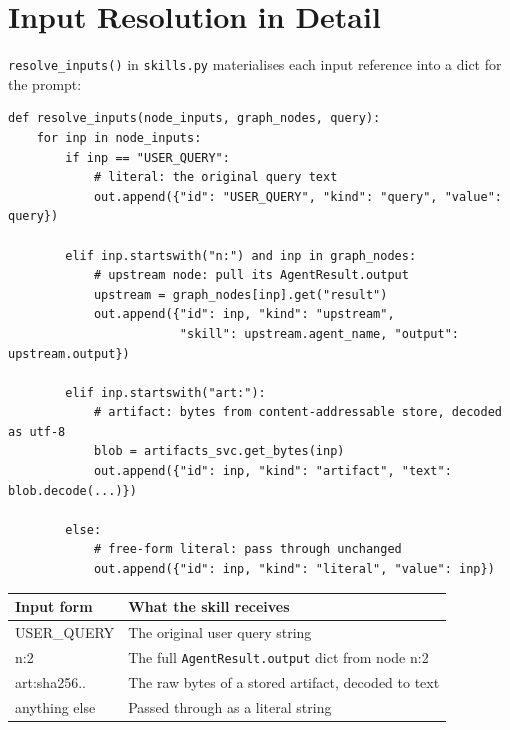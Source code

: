 \documentclass[12pt,a4paper]{article}
\begin{document}
\section{Input Resolution in Detail}

\texttt{resolve\_inputs()} in \texttt{skills.py} materialises each input
reference into a dict for the prompt:

\begin{lstlisting}[style=pycode, caption={Input resolution — skills.py:77--110}]
def resolve_inputs(node_inputs, graph_nodes, query):
    for inp in node_inputs:
        if inp == "USER_QUERY":
            # literal: the original query text
            out.append({"id": "USER_QUERY", "kind": "query", "value": query})

        elif inp.startswith("n:") and inp in graph_nodes:
            # upstream node: pull its AgentResult.output
            upstream = graph_nodes[inp].get("result")
            out.append({"id": inp, "kind": "upstream",
                        "skill": upstream.agent_name, "output": upstream.output})

        elif inp.startswith("art:"):
            # artifact: bytes from content-addressable store, decoded as utf-8
            blob = artifacts_svc.get_bytes(inp)
            out.append({"id": inp, "kind": "artifact", "text": blob.decode(...)})

        else:
            # free-form literal: pass through unchanged
            out.append({"id": inp, "kind": "literal", "value": inp})
\end{lstlisting}

\begin{center}
\begin{tabular}{>{\ttfamily}p{3cm} p{9.5cm}}
\toprule
\normalfont\textbf{Input form} & \normalfont\textbf{What the skill receives} \\
\midrule
USER\_QUERY  & The original user query string \\
n:2          & The full \texttt{AgentResult.output} dict from node n:2 \\
art:sha256.. & The raw bytes of a stored artifact, decoded to text \\
anything else & Passed through as a literal string \\
\bottomrule
\end{tabular}
\end{center}

\end{document}
